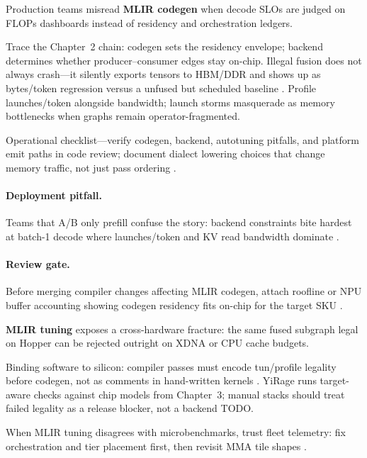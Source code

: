 Production teams misread \textbf{MLIR codegen} when decode SLOs are judged on FLOPs dashboards instead of residency and orchestration ledgers.

Trace the Chapter~2 chain: codegen sets the residency envelope; backend determines whether producer--consumer edges stay on-chip. Illegal fusion does not always crash---it silently exports tensors to HBM/DDR and shows up as bytes/token regression versus a unfused but scheduled baseline \citep{yirage2026,chen2020compilerbasedhardw}. Profile launches/token alongside bandwidth; launch storms masquerade as memory bottlenecks when graphs remain operator-fragmented.

Operational checklist---verify codegen, backend, autotuning pitfalls, and platform emit paths in code review; document dialect lowering choices that change memory traffic, not just pass ordering \citep{yirage2026,chen2020compilerbasedhardw}.

\paragraph{Deployment pitfall.} Teams that A/B only prefill confuse the story: backend constraints bite hardest at batch-1 decode where launches/token and KV read bandwidth dominate \citep{yirage2026,chen2020compilerbasedhardw}.

\paragraph{Review gate.} Before merging compiler changes affecting MLIR codegen, attach roofline or NPU buffer accounting showing codegen residency fits on-chip for the target SKU \citep{yirage2026,chen2020compilerbasedhardw}.

\textbf{MLIR tuning} exposes a cross-hardware fracture: the same fused subgraph legal on Hopper can be rejected outright on XDNA or CPU cache budgets.

Binding software to silicon: compiler passes must encode tun/profile legality before codegen, not as comments in hand-written kernels \citep{yirage2026,chen2020compilerbasedhardw}. YiRage runs target-aware checks against chip models from Chapter~3; manual stacks should treat failed legality as a release blocker, not a backend TODO.

When MLIR tuning disagrees with microbenchmarks, trust fleet telemetry: fix orchestration and tier placement first, then revisit MMA tile shapes \citep{yirage2026,chen2020compilerbasedhardw}.

